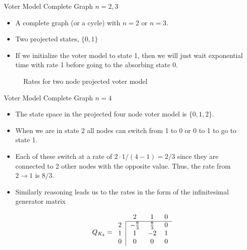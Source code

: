 \documentclass{beamer}
\theoremstyle{definition}
\begin{document}
\begin{frame}{Voter Model Complete Graph $n = 2,3$}
    \begin{itemize}
        \item A complete graph (or a cycle) with $n = 2$ or $n = 3$.
        \item Two projected states, $\{0,1\}$
        \item If we initialize the voter model to state 1, then we will just wait exponential time with rate 1 before going to the absorbing state 0. 
    \end{itemize}
    
\begin{figure}[H]    
    \caption{Rates for two node projected voter model}
    \label{fig:rates_mc_two_contact}
\end{figure}
\end{frame}

\begin{frame}{Voter Model Complete Graph $n = 4$}
\begin{itemize}
    \item The state space in the projected four node voter model is $\{0,1,2\}$.
    \item When we are in state 2 all nodes can switch from 1 to 0 or 0 to 1 to go to state 1.
    \item Each of these switch at a rate of $2 \cdot 1/(4 - 1) = 2/3$ since they are connected to 2 other nodes with the opposite value. Thus, the rate from $2 \to 1$ is $8/3$.
    \item Similarly reasoning leads us to the rates in the form of the infinitesimal generator matrix

$$
Q_{K_4} = \begin{blockarray}{cccc}
    & 2 & 1 & 0\\
    \begin{block}{c|ccc}
        \cline{2-4}
        2 & -\frac{8}{3} & \frac{8}{3} & 0 \\
        1 & 1 & -2 & 1\\
        0 & 0 & 0 & 0\\
    \end{block}
\end{blockarray}
$$
\end{itemize}
\end{frame}
\end{document}
